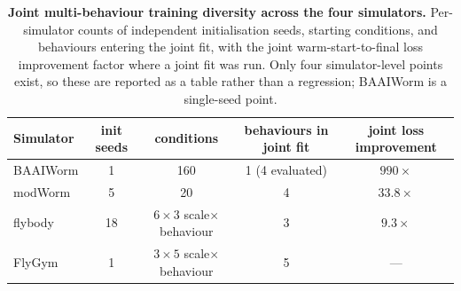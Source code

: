 \documentclass[11pt]{article}
\begin{document}
\begin{table}[H]\centering\small
\caption{\textbf{Joint multi-behaviour training diversity across the four simulators.} Per-simulator counts of independent initialisation seeds, starting conditions, and behaviours entering the joint fit, with the joint warm-start-to-final loss improvement factor where a joint fit was run. Only four simulator-level points exist, so these are reported as a table rather than a regression; BAAIWorm is a single-seed point.}
\label{tab:train_diversity}
\begin{tabular}{lcccc}\toprule
Simulator & init seeds & conditions & behaviours in joint fit & joint loss improvement \\\midrule
BAAIWorm & 1 & 160 & 1 (4 evaluated) & $990\times$ \\
modWorm & 5 & 20 & 4 & $33.8\times$ \\
flybody & 18 & $6\times3$ scale$\times$behaviour & 3 & $9.3\times$ \\
FlyGym & 1 & $3\times5$ scale$\times$behaviour & 5 & --- \\\bottomrule
\end{tabular}
\end{table}
\end{document}
